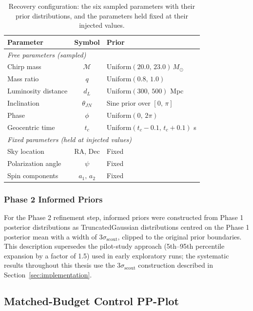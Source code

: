 \documentclass[12pt]{article}
\begin{document}
\begin{table}[ht]
\centering
\caption{Recovery configuration: the six sampled parameters with their prior distributions, and the parameters held fixed at their injected values.}
\label{tab:recovery_priors}
\begin{tabular}{|l|c|l|}
\hline
\textbf{Parameter} & \textbf{Symbol} & \textbf{Prior} \\
\hline
\multicolumn{3}{|l|}{\textit{Free parameters (sampled)}} \\
\hline
Chirp mass & $\mathcal{M}$ & Uniform$(20.0,\,23.0)\,M_\odot$ \\
Mass ratio & $q$ & Uniform$(0.8,\,1.0)$ \\
Luminosity distance & $d_L$ & Uniform$(300,\,500)$ Mpc \\
Inclination & $\theta_{JN}$ & Sine prior over $[0,\,\pi]$ \\
Phase & $\phi$ & Uniform$(0,\,2\pi)$ \\
Geocentric time & $t_c$ & Uniform$(t_c - 0.1,\,t_c + 0.1)$ s \\
\hline
\multicolumn{3}{|l|}{\textit{Fixed parameters (held at injected values)}} \\
\hline
Sky location & RA, Dec & Fixed \\
Polarization angle & $\psi$ & Fixed \\
Spin components & $a_1,\,a_2$ & Fixed \\
\hline
\end{tabular}
\end{table}

\subsubsection{Phase 2 Informed Priors}
For the Phase 2 refinement step, informed priors were constructed from Phase 1 posterior distributions as TruncatedGaussian distributions centred on the Phase 1 posterior mean with a width of $3\sigma_{\mathrm{scout}}$, clipped to the original prior boundaries. This description supersedes the pilot-study approach (5th--95th percentile expansion by a factor of 1.5) used in early exploratory runs; the systematic results throughout this thesis use the $3\sigma_{\mathrm{scout}}$ construction described in Section~\ref{sec:implementation}.

\subsection{Matched-Budget Control PP-Plot}
\label{appendix:pp_controls}
\end{document}
